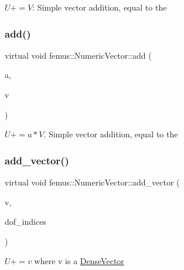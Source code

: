 $U+=V$\+: Simple vector addition, equal to the 

\mbox{\label{classfemus_1_1_numeric_vector_abff6f46504f6e04bd8cc36944697cc27}} 
\subsubsection{\texorpdfstring{add()}{add()}\hspace{0.1cm}{\footnotesize\ttfamily [4/4]}}
{\footnotesize\ttfamily virtual void femus\+::\+Numeric\+Vector\+::add (\begin{DoxyParamCaption}\item[{const double}]{a,  }\item[{const \mbox{\hyperlink{classfemus_1_1_numeric_vector}{Numeric\+Vector}} \&}]{v }\end{DoxyParamCaption})\hspace{0.3cm}{\ttfamily [pure virtual]}}



$U+=a*V$. Simple vector addition, equal to the 

\mbox{\label{classfemus_1_1_numeric_vector_a7189cbf63afd3adf254971ec36809c07}} 
\subsubsection{\texorpdfstring{add\+\_\+vector()}{add\_vector()}\hspace{0.1cm}{\footnotesize\ttfamily [1/4]}}
{\footnotesize\ttfamily virtual void femus\+::\+Numeric\+Vector\+::add\+\_\+vector (\begin{DoxyParamCaption}\item[{const std\+::vector$<$ double $>$ \&}]{v,  }\item[{const std\+::vector$<$ int $>$ \&}]{dof\+\_\+indices }\end{DoxyParamCaption})\hspace{0.3cm}{\ttfamily [pure virtual]}}



$ U+=v $ where v is a \mbox{\hyperlink{classfemus_1_1_dense_vector}{Dense\+Vector}} 

